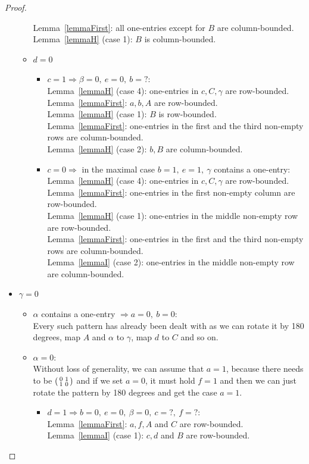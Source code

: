 \begin{proof}
\begin{itemize}
\begin{itemize}
				Lemma~\ref{lemmaFirst}: all one-entries except for $B$ are column-bounded.\\
				Lemma~\ref{lemmaH} (case 1): $B$ is column-bounded.
			\item $d=0$
				\begin{itemize}
					\item $c=1\Rightarrow\beta=0,\ e=0,\ b=?$:\\
						Lemma~\ref{lemmaH} (case 4): one-entries in $c,C,\gamma$ are row-bounded.\\
						Lemma~\ref{lemmaFirst}: $a,b,A$ are row-bounded.\\
						Lemma~\ref{lemmaH} (case 1): $B$ is row-bounded.\\
						
						Lemma~\ref{lemmaFirst}: one-entries in the first and the third non-empty rows are column-bounded.\\
						Lemma~\ref{lemmaH} (case 2): $b,B$ are column-bounded.
					\item $c=0\Rightarrow$ in the maximal case $b=1,\ e=1,\ \gamma$ contains a one-entry:\\
						Lemma~\ref{lemmaH} (case 4): one-entries in $c,C,\gamma$ are row-bounded.\\
						Lemma~\ref{lemmaFirst}: one-entries in the first non-empty column are row-bounded.\\
						Lemma~\ref{lemmaH} (case 1): one-entries in the middle non-empty row are row-bounded.\\
						
						Lemma~\ref{lemmaFirst}: one-entries in the first and the third non-empty rows are column-bounded.\\
						Lemma~\ref{lemmaI} (case 2): one-entries in the middle non-empty row are column-bounded.
				\end{itemize}
		\end{itemize}
	\item $\gamma=0$
		\begin{itemize}
			\item $\alpha$ contains a one-entry $\Rightarrow a=0,\ b=0$:\\
				Every such pattern has already been dealt with as we can rotate it by 180 degrees, map $A$ and $\alpha$ to $\gamma$, map $d$ to $C$ and so on.
			\item $\alpha=0$:\\
				Without loss of generality, we can assume that $a=1$, because there needs to be $\left(\begin{smallmatrix}0&1\\1&0\end{smallmatrix}\right)$ and if we set $a=0$, it must hold $f=1$ and then we can just rotate the pattern by 180 degrees and get the case $a=1$.
				\begin{itemize}
					\item $d=1\Rightarrow b=0,\ e=0,\ \beta=0,\ c=?,\ f=?$:\\
						Lemma~\ref{lemmaFirst}: $a,f,A$ and $C$ are row-bounded.\\
						Lemma~\ref{lemmaI} (case 1): $c,d$ and $B$ are row-bounded.\\
						

\end{itemize}
\end{itemize}
\end{itemize}
\end{proof}

